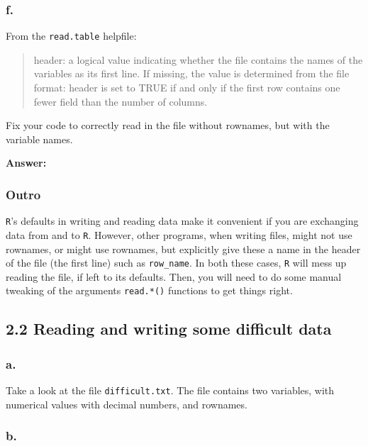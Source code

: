 \documentclass[]{article}
\begin{document}
\hypertarget{f.-2}{%
\subsubsection{f.}\label{f.-2}}

From the \texttt{read.table} helpfile:

\begin{quote}
header: a logical value indicating whether the file contains the names
of the variables as its first line. If missing, the value is determined
from the file format: header is set to TRUE if and only if the first row
contains one fewer field than the number of columns.
\end{quote}

Fix your code to correctly read in the file without rownames, but with
the variable names.

\textbf{Answer:}

\hypertarget{outro-1}{%
\subsubsection{Outro}\label{outro-1}}

\texttt{R}'s defaults in writing and reading data make it convenient if
you are exchanging data from and to \texttt{R}. However, other programs,
when writing files, might not use rownames, or might use rownames, but
explicitly give these a name in the header of the file (the first line)
such as \texttt{row\_name}. In both these cases, \texttt{R} will mess up
reading the file, if left to its defaults. Then, you will need to do
some manual tweaking of the arguments \texttt{read.*()} functions to get
things right.

\hypertarget{reading-and-writing-some-difficult-data}{%
\subsection{2.2 Reading and writing some difficult
data}\label{reading-and-writing-some-difficult-data}}

\hypertarget{a.-5}{%
\subsubsection{a.}\label{a.-5}}

Take a look at the file \texttt{difficult.txt}. The file contains two
variables, with numerical values with decimal numbers, and rownames.

\hypertarget{b.-5}{%
\subsubsection{b.}\label{b.-5}}
\end{document}
